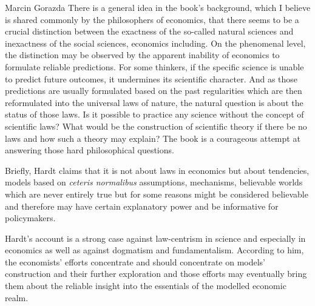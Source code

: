 \begin{recengenv}{Marcin Gorazda}
There is a general idea in the book’s background, which I believe is shared commonly by the philosophers of economics,
that there seems to be a crucial distinction between the exactness of the so-called natural sciences and inexactness of
the social sciences, economics including. On the phenomenal level, the distinction may be observed by the apparent
inability of economics to formulate reliable predictions. For some thinkers, if the specific science is unable to
predict future outcomes, it undermines its scientific character. And as those predictions are usually formulated based
on the past regularities which are then reformulated into the universal laws of nature, the natural question is about
the status of those laws. Is it possible to practice any science without the concept of scientific laws? What would be
the construction of scientific theory if there be no laws and how such a theory may explain? The book is a courageous
attempt at answering those hard philosophical questions. 

Briefly, Hardt claims that it is not about laws in economics but about tendencies, models based on \textit{ceteris
normalibus} assumptions, mechanisms, believable worlds which are never entirely true but for some reasons might be
considered believable and therefore may have certain explanatory power and be informative for policymakers.

\enlargethispage{-1\baselineskip}

Hardt’s account is a strong case against law-centrism in science and especially in economics as well as against
dogmatism and fundamentalism. According to him, the economists’ efforts concentrate and should concentrate on models’
construction and their further exploration and those efforts may eventually bring them about the reliable insight into
the essentials of the modelled economic realm. 


\end{recengenv}
